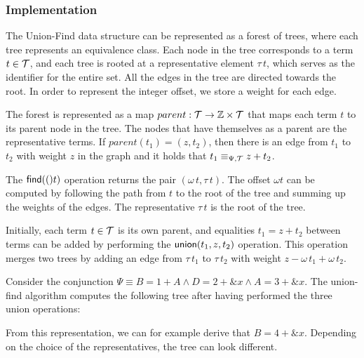 \subsubsection{Implementation}

The Union-Find data structure can be represented as a forest of trees,
where each tree represents an equivalence class.
Each node in the tree corresponds to a term $t \in \mathcal{T}$, and each tree is rooted at a representative element $\tau\,t$,
which serves as the identifier for the entire set.\cite{uf-tarjan}
All the edges in the tree are directed towards the root.
In order to represent the integer offset, we store a weight for each edge.

The forest is represented as a map $parent : \mathcal{T} \rightarrow \mathbb{Z} \times \mathcal{T}$ that maps each
term $t$ to its parent node in the tree.
The nodes that have themselves as a parent are the representative terms.
If $parent(t_1) = (z,t_2)$, then there is an edge from $t_1$ to $t_2$ with weight $z$
in the graph and it holds that $t_1 \equiv_{\Psi,\mathcal{T}} z + t_2$.

The $\textsf{find}(()t)$ operation returns the pair $(\omega\,t,\tau\,t)$.
The offset $\omega t$ can be computed by following the path from $t$ to the root of the tree and summing up the weights of the edges.
The representative $\tau\,t$ is the root of the tree.

Initially, each term $t\in\mathcal{T}$ is its own parent, and equalities $t_1 = z + t_2$ between terms can be added by performing the
$\textsf{union}(t_1, z, t_2)$ operation.
This operation merges two trees by adding an edge from $\tau\,t_1$ to $\tau\,t_2$ with weight $z - \omega\,t_1 + \omega\,t_2$.

\begin{example}
Consider the conjunction $\Psi \equiv B = 1 + A \land D = 2 + \&x \land A = 3 + \&x$.
The union-find algorithm computes the following tree after having performed the three union operations:


From this representation, we can for example derive that $B = 4 + \&x$.
Depending on the choice of the representatives, the tree can look different.
\end{example}

